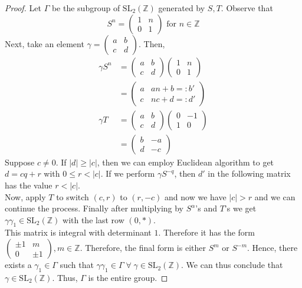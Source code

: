 \documentclass[oneside, 12pt]{scrbook}
\newcommand{\ZZ}{\mathbb Z}
\newcommand{\SL}{\mathrm{SL}}
\theoremstyle{theorem}
\begin{document}
\begin{proof}
Let $\Gamma$ be the subgroup of $\SL_{2}(\ZZ)$ generated by $S,T$. Observe that 
\begin{equation}
S^n = \begin{pmatrix}
1 & n \\ 0 & 1
\end{pmatrix} \text{ for } n \in \ZZ
\end{equation}
Next, take an element $\gamma = \begin{pmatrix}
a & b \\ c & d
\end{pmatrix}$. Then, 
\begin{align*}
\gamma S^n &= \begin{pmatrix}
a & b \\ c & d
\end{pmatrix}\begin{pmatrix}
1 & n \\ 0 & 1
\end{pmatrix} \\
&= \begin{pmatrix}
a & an + b = :b' \\ c & nc +d =: d'
\end{pmatrix} \\
\gamma T &= \begin{pmatrix}
a & b \\ c & d
\end{pmatrix}\begin{pmatrix}
0 & -1 \\ 1 & 0
\end{pmatrix} \\
&= \begin{pmatrix}
b & -a \\ d & -c
\end{pmatrix}
\end{align*}
Suppose $c \neq 0$. If $|d| \geq |c|$, then we can employ Euclidean algorithm to get $d = cq + r$ with $0 \le r < |c|$. If we perform $\gamma S^{-q}$, then $d'$ in the following matrix has the value $r < |c|$. \\

Now, apply $T$ to switch $(c,r)$ to $(r, -c)$ and now we have $|c|>r$ and we can continue the process. Finally after multiplying by $S^{\alpha}$'s and $T$'s we get $\gamma \gamma_{1} \in \SL_{2}(\ZZ)$ with the last row $(0, *)$. \\

This matrix is integral with determinant $1$. Therefore it has the form $\begin{pmatrix}
\pm 1 & m \\ 0 & \pm 1
\end{pmatrix}, m \in \ZZ$. Therefore, the final form is either $S^m$ or $S^{-m}$. Hence, there exists a $\gamma_{1} \in \Gamma$ such that $\gamma \gamma_{1} \in \Gamma \; \forall \; \gamma \in \SL_{2}(\ZZ)$. We can thus conclude that $\gamma \in \SL_{2}(\ZZ)$. Thus, $\Gamma$ is the entire group.
\end{proof}
\end{document}
